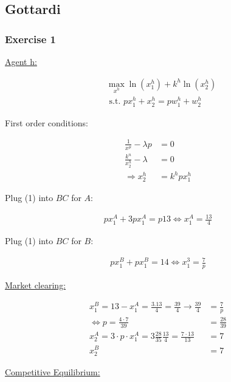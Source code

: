 \newpage
{
\subsection*{Gottardi}

\subsubsection*{Exercise 1}

\begin{enumerate}[label=(\alph*)]
{\item 
\underline{Agent h:} 

\begin{align*}
    & \max _{x^h} \ln \left(x_1^h\right)+k^h \ln \left(x_2^h\right) \\
    & \text { s.t. } p x_1^h+x_2^h=p w_1^h+w_2^h
\end{align*}

First order conditions:

\begin{align*}
    \frac{1}{x^\mu}-\lambda p &= 0 \\
    \frac{k^n}{x_2^h}-\lambda &= 0 \\
    \Rightarrow x_2^h &= k^h p x_1^h \tag{1}
\end{align*}

Plug (1) into $B C$ for $A$:

\begin{align*}
p x_1^A+3 p x_1^A=p 13 \Longleftrightarrow x_1^A=\frac{13}{4}
\end{align*}

Plug (1) into $B C$ for $B$:

\begin{align*}
p x_1^B+p x_1^B=14 \Longleftrightarrow x_1^3=\frac{7}{p}
\end{align*}

\underline{Market clearing:}

\begin{align*}
    x_1^B=13-x_1^A=\frac{3.13}{4}=\frac{39}{4} \rightarrow \frac{39}{4}&=\frac{7}{p} \\
    \Longleftrightarrow p=\frac{4\cdot7}{39}&=\frac{28}{39} \\
    x_2^A=3 \cdot p \cdot x_1^A=3 \frac{28}{35} \frac{13}{4}=\frac{7 \cdot 13}{13}&=7 \\
    x_2^B&=7
\end{align*}

\underline{Competitive Equilibrium:}

}
\end{enumerate}}
